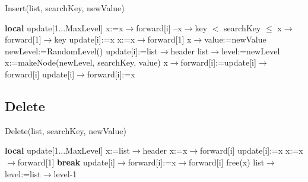 \documentclass[10pt,english, openany]{book}
\begin{document}
\begin{algorithm}[htb]
\caption{Insert(list, searchKey, newValue)}	
\begin{algorithmic}[1]
	 \Require
	 \Ensure
	 \State \textbf{local} update[1...MaxLevel]
	 \State x:=x$\rightarrow$forward[i]
	 \State --x$\rightarrow$key $<$ searchKey $\leq$ x$\rightarrow$forward[1]$\rightarrow$key
	 \EndWhile
	 \State update[i]:=x
	 \EndFor
	 \State x:=x$\rightarrow$forward[1]
	 \State x$\rightarrow$value:=newValue
	 \Else
	 \State newLevel:=RandomLevel()
	 \State update[i]:=list$\rightarrow$header
	 \EndFor
	 \State list$\rightarrow$level:=newLevel
	 \EndIf
	 \State x:=makeNode(newLevel, searchKey, value)
	 \State x$\rightarrow$forward[i]:=update[i]$\rightarrow$forward[i]
	 \State update[i]$\rightarrow$forward[i]:=x
	 \EndFor
	 \EndIf
\end{algorithmic}
\end{algorithm}

\subsection{Delete}

\begin{algorithm}
\caption{Delete(list, searchKey, newValue)}	
\begin{algorithmic}[1]
	 \Require
	 \Ensure
	 \State \textbf{local} update[1...MaxLevel]
	 \State x:=list$\rightarrow$header
	 \State x:=x$\rightarrow$forward[i]
	 \EndWhile
	 \State update[i]:=x
	 \EndFor
	 \State x:=x$\rightarrow$forward[1]
	 \State \textbf{break}
	 \EndIf
	 \State update[i]$\rightarrow$forward[i]:=x$\rightarrow$forward[i]
	 \EndFor
	 \State free(x)
	 \State list$\rightarrow$level:=list$\rightarrow$level-1
	 \EndWhile
	 \EndIf
\end{algorithmic}
\end{algorithm}
\end{document}
